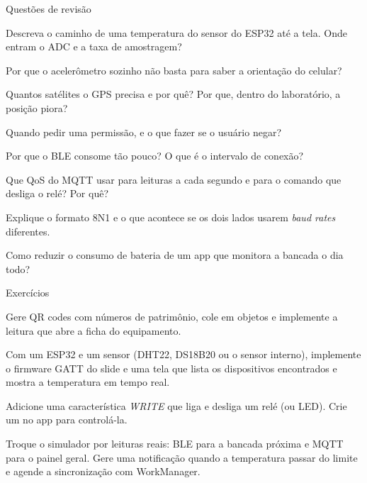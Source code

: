 \documentclass[aspectratio=169,10pt]{beamer}
\begin{document}
\begin{frame}{Questões de revisão}
  \begin{questoes}
    \item Descreva o caminho de uma temperatura do sensor do ESP32 até a tela. Onde entram o ADC e a taxa de amostragem?
    \item Por que o acelerômetro sozinho não basta para saber a orientação do celular?
    \item Quantos satélites o GPS precisa e por quê? Por que, dentro do laboratório, a posição piora?
    \item Quando pedir uma permissão, e o que fazer se o usuário negar?
    \item Por que o BLE consome tão pouco? O que é o intervalo de conexão?
    \item Que QoS do MQTT usar para leituras a cada segundo e para o comando que desliga o relé? Por quê?
    \item Explique o formato 8N1 e o que acontece se os dois lados usarem \emph{baud rates} diferentes.
    \item Como reduzir o consumo de bateria de um app que monitora a bancada o dia todo?
  \end{questoes}
\end{frame}

\begin{frame}{Exercícios}
  \begin{exercicio}
    Gere QR codes com números de patrimônio, cole em objetos e implemente a leitura que abre a ficha do equipamento.
  \end{exercicio}
  \begin{exercicio}
    Com um ESP32 e um sensor (DHT22, DS18B20 ou o sensor interno), implemente o firmware GATT do slide e uma tela que lista os dispositivos encontrados e mostra a temperatura em tempo real.
  \end{exercicio}
  \begin{exercicio}
    Adicione uma característica \emph{WRITE} que liga e desliga um relé (ou LED). Crie um  no app para controlá-la.
  \end{exercicio}
  \begin{projeto}
    Troque o simulador por leituras reais: BLE para a bancada próxima e MQTT para o painel geral. Gere uma notificação quando a temperatura passar do limite e agende a sincronização com WorkManager.
  \end{projeto}
\end{frame}
\end{document}
